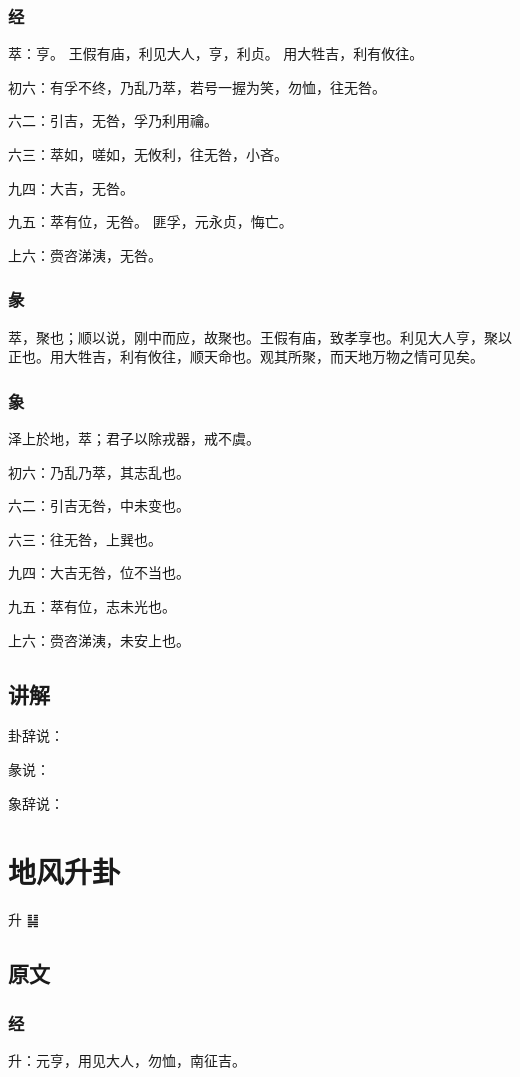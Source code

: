 \documentclass[12pt,oneside]{book}
\begin{document}
\subsection{经}
萃：亨。 王假有庙，利见大人，亨，利贞。 用大牲吉，利有攸往。

初六：有孚不终，乃乱乃萃，若号一握为笑，勿恤，往无咎。

六二：引吉，无咎，孚乃利用禴。

六三：萃如，嗟如，无攸利，往无咎，小吝。

九四：大吉，无咎。

九五：萃有位，无咎。 匪孚，元永贞，悔亡。

上六：赍咨涕洟，无咎。

\subsection{彖}
萃，聚也；顺以说，刚中而应，故聚也。王假有庙，致孝享也。利见大人亨，聚以正也。用大牲吉，利有攸往，顺天命也。观其所聚，而天地万物之情可见矣。

\subsection{象}
泽上於地，萃；君子以除戎器，戒不虞。

初六：乃乱乃萃，其志乱也。

六二：引吉无咎，中未变也。

六三：往无咎，上巽也。

九四：大吉无咎，位不当也。

九五：萃有位，志未光也。

上六：赍咨涕洟，未安上也。

\section{讲解}
卦辞说：

彖说：

象辞说：

\chapter{地风升卦}
升 {\Large ䷭}

\section{原文}

\subsection{经}
升：元亨，用见大人，勿恤，南征吉。
\end{document}
